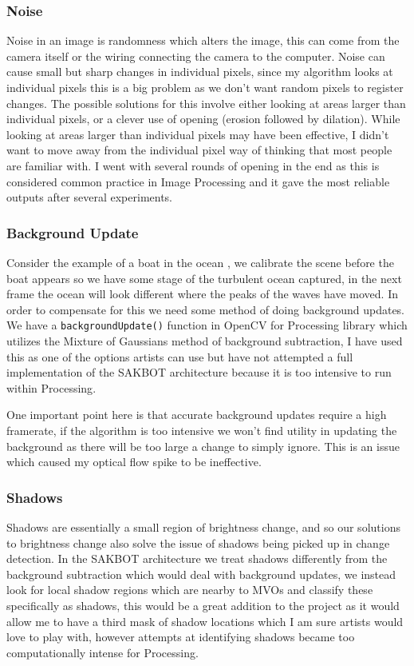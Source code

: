 \documentclass[a4paper]{report}
\begin{document}
\subsubsection{Noise}
Noise in an image is randomness which alters the image, this can come from the camera itself or the wiring connecting the camera to the computer. Noise can cause small but sharp changes in individual pixels, since my algorithm looks at individual pixels this is a big problem as we don't want random pixels to register changes. The possible solutions for this involve either looking at areas larger than individual pixels, or a clever use of opening (erosion followed by dilation). While looking at areas larger than individual pixels may have been effective, I didn't want to move away from the individual pixel way of thinking that most people are familiar with. I went with several rounds of opening in the end as this is considered common practice in Image Processing and it gave the most reliable outputs after several experiments.

\subsubsection{Background Update}
Consider the example of a boat in the ocean , we calibrate the scene before the boat appears so we have some stage of the turbulent ocean captured, in the next frame the ocean will look different where the peaks of the waves have moved. In order to compensate for this we need some method of doing background updates. We have a \verb|backgroundUpdate()| function in OpenCV for Processing library\cite{OPENCV} which utilizes the Mixture of Gaussians method of background subtraction, I have used this as one of the options artists can use but have not attempted a full implementation of the SAKBOT architecture\cite{SAKBOT} because it is too intensive to run within Processing\cite{PROCESSING}.

One important point here is that accurate background updates require a high framerate, if the algorithm is too intensive we won't find utility in updating the background as there will be too large a change to simply ignore. This is an issue which caused my optical flow spike to be ineffective.

\subsubsection{Shadows}
Shadows are essentially a small region of brightness change, and so our solutions to brightness change also solve the issue of shadows being picked up in change detection. In the SAKBOT architecture\cite{SAKBOT} we treat shadows differently from the background subtraction which would deal with background updates, we instead look for local shadow regions which are nearby to MVOs and classify these specifically as shadows, this would be a great addition to the project as it would allow me to have a third mask of shadow locations which I am sure artists would love to play with, however attempts at identifying shadows became too computationally intense for Processing\cite{PROCESSING}.
\end{document}
